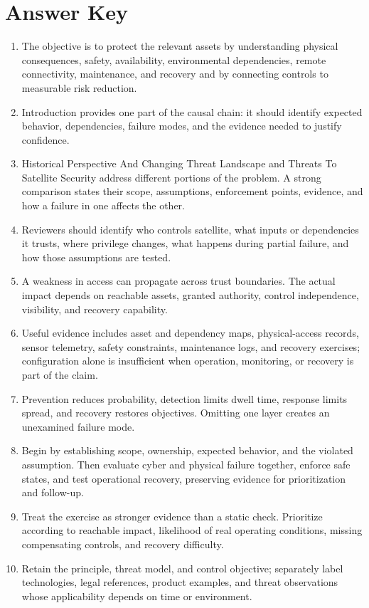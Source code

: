 \documentclass[11pt,letterpaper]{article}
\begin{document}
\section*{Answer Key}
\begin{enumerate}
\item The objective is to protect the relevant assets by understanding physical consequences, safety, availability, environmental dependencies, remote connectivity, maintenance, and recovery and by connecting controls to measurable risk reduction.
\item Introduction provides one part of the causal chain: it should identify expected behavior, dependencies, failure modes, and the evidence needed to justify confidence.
\item Historical Perspective And Changing Threat Landscape and Threats To Satellite Security address different portions of the problem. A strong comparison states their scope, assumptions, enforcement points, evidence, and how a failure in one affects the other.
\item Reviewers should identify who controls satellite, what inputs or dependencies it trusts, where privilege changes, what happens during partial failure, and how those assumptions are tested.
\item A weakness in access can propagate across trust boundaries. The actual impact depends on reachable assets, granted authority, control independence, visibility, and recovery capability.
\item Useful evidence includes asset and dependency maps, physical-access records, sensor telemetry, safety constraints, maintenance logs, and recovery exercises; configuration alone is insufficient when operation, monitoring, or recovery is part of the claim.
\item Prevention reduces probability, detection limits dwell time, response limits spread, and recovery restores objectives. Omitting one layer creates an unexamined failure mode.
\item Begin by establishing scope, ownership, expected behavior, and the violated assumption. Then evaluate cyber and physical failure together, enforce safe states, and test operational recovery, preserving evidence for prioritization and follow-up.
\item Treat the exercise as stronger evidence than a static check. Prioritize according to reachable impact, likelihood of real operating conditions, missing compensating controls, and recovery difficulty.
\item Retain the principle, threat model, and control objective; separately label technologies, legal references, product examples, and threat observations whose applicability depends on time or environment.
\end{enumerate}
\end{document}
